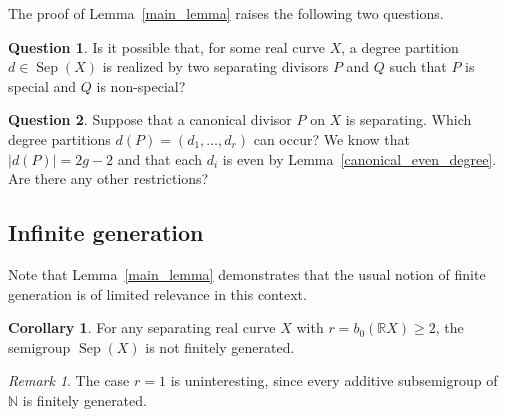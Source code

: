 \documentclass[x11names,oneside,11pt]{amsart}
\theoremstyle{definition}
\newtheorem{corollary}{Corollary}
\newtheorem{question}{Question}
\theoremstyle{remark}
\newtheorem{remark}{Remark}
\DeclareMathOperator{\Sep}{Sep}
\newcommand{\N}{\mathbb{N}}
\newcommand{\R}{\mathbb{R}}
\begin{document}
  The proof of Lemma~\ref{main_lemma} raises the following two questions.

  \begin{question}
    Is it possible that, for some real curve $X$, a degree partition $d \in \Sep(X)$ is realized by two separating divisors $P$ and $Q$ such that $P$ is special and $Q$ is non-special?
  \end{question}

  \begin{question}
  Suppose that a canonical divisor $P$ on $X$ is separating. Which degree partitions $d(P) = (d_1, \ldots, d_r)$ can occur? We know that $|d(P)| = 2g - 2$ and that each $d_i$ is even by Lemma~\ref{canonical_even_degree}. Are there any other restrictions?
  \end{question}  

  \subsection{Infinite generation}

  Note that Lemma~\ref{main_lemma} demonstrates that the usual notion of finite generation is of limited relevance in this context.

  \begin{corollary}\label{infin_gen}
  For any separating real curve $X$ with $r = b_0(\R X) \geqslant 2$, the semigroup $\Sep(X)$ is not finitely generated.
  \end{corollary}

  \begin{remark}
  The case $r = 1$ is uninteresting, since every additive subsemigroup of $\N$ is finitely generated.
  \end{remark}
\end{document}
